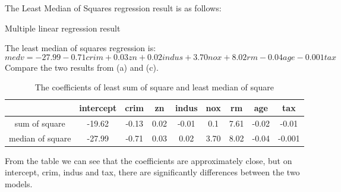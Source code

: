 \documentclass[10pt,letterpaper]{article}
\begin{document}
\begin{enumerate}[leftmargin=0cm,itemindent=.5cm,labelwidth=\itemindent,labelsep=0cm,align=left]
The Least Median of Squares regression result is as follows:
\begin{center}
Multiple linear regression result 

\end{center}

The least median of squares regression is:  \[medv = -27.99 - 0.71crim + 0.03zn + 0.02indus + 3.70nox + 8.02rm - 0.04age - 0.001tax\] 
Compare the two results from (a) and (c). 

\begin{table}[h]
\caption{The coefficients of least sum of square and least median of square}
\centering
\begin{tabular*}{0.9\linewidth}{@{\extracolsep{\fill}}ccccccccc}
\hline 
 & intercept & crim & zn & indus & nox & rm & age & tax \\
\hline
sum of square & -19.62 & -0.13 & 0.02 & -0.01 & 0.1 & 7.61 & -0.02 & -0.01\\
\hline
median of square & -27.99 & -0.71 & 0.03 & 0.02 & 3.70 & 8.02 & -0.04 & -0.001\\
\end{tabular*}
\end{table}

From the table we can see that the coefficients are approximately close, but on intercept, crim, indus and tax, there are significantly differences between the two models.
\end{enumerate}
\end{document}
